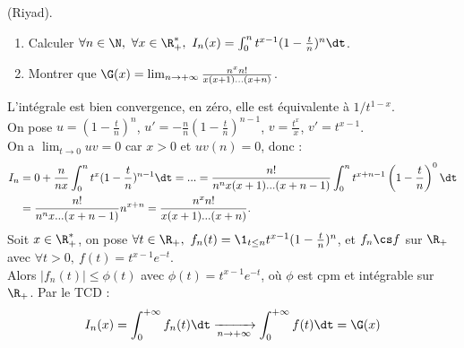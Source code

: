 \documentclass[11pt]{article}
\begin{document}
\vspace*{-0.8cm}

\begin{exercice}{(Riyad).}{}
    \begin{enumerate}
        \item Calculer $\forall n \in \N, ~ \forall x \in \R_+^*, ~ I_n(x) = \int_0^n t^{x-1}(1-\frac{t}{n})^n\dt$.
        \item Montrer que $\G(x)=\lim_{n\to+\infty}\frac{n^xn!}{x(x+1)...(x+n)}$.
    \end{enumerate}
    \tcblower
    L'intégrale est bien convergence, en zéro, elle est équivalente à $1/t^{1-x}$.\\
     On pose $u=\left( 1-\frac{t}{n} \right)^n$, $u'=-\frac{n}{n}\left( 1 - \frac{t}{n} \right)^{n-1}$, $v=\frac{t^x}{x}$, $v'=t^{x-1}$.\\
    On a $\lim_{t\to 0}uv=0$ car $x>0$ et $uv(n)=0$, donc :
    \begin{align*}
        I_n &= 0 + \frac{n}{nx}\int_0^nt^x(1-\frac{t}{n})^{n-1}\dt = ... = \frac{n!}{n^nx(x+1)...(x+n-1)}\int_0^nt^{x+n-1}\left( 1-\frac{t}{n} \right)^0 \dt\\
        &=\frac{n!}{n^nx...(x+n-1)} n^{x+n} = \frac{n^xn!}{x(x+1)...(x+n)}.
    \end{align*}
     Soit $x\in\R_+^*$, on pose $\forall t \in \R_+, ~ f_n(t)=\1_{t\leq n}t^{x-1}(1-\frac{t}{n})^n$, et $f_n\cs f$ sur $\R_+$ avec $\forall t > 0, ~ f(t)=t^{x-1}e^{-t}$.\\
    Alors $|f_n(t)|\leq \phi(t)$ avec $\phi(t)=t^{x-1}e^{-t}$, où $\phi$ est cpm et intégrable sur $\R_+$. Par le TCD :
    \begin{equation*}
        I_n(x) = \int_0^{+\infty}f_n(t)\dt \xrightarrow[n\to+\infty]{} \int_0^{+\infty}f(t)\dt = \G(x)
    \end{equation*}
\end{exercice}
\end{document}
